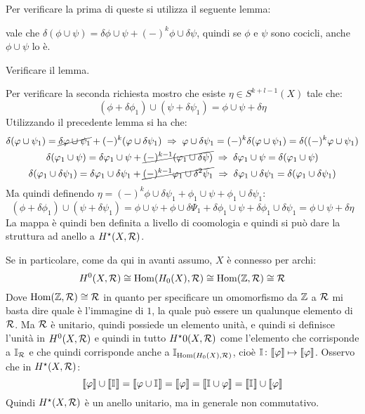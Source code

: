 Per verificare la prima di queste si utilizza il seguente lemma:
\begin{lemma}
  vale che $ \delta(\phi \cup \psi) = \delta \phi \cup \psi + (-)^k \phi \cup \delta \psi $, quindi se $ \phi $ e $ \psi $ sono cocicli,
  anche $ \phi \cup \psi $ lo è.
\end{lemma}
\begin{exercise}
  Verificare il lemma.
\end{exercise}
Per verificare la seconda richiesta mostro che esiste $ \eta \in S^{k+l-1}(X) $ tale che:
\[
  (\phi + \delta\phi_1) \cup (\psi + \delta\psi_1) = \phi \cup \psi + \delta \eta
\]
Utilizzando il precedente lemma si ha che:
\begin{gather*}
  \delta(\phi \cup \psi_1) = \cancel{\delta \phi \cup \psi_1} + (-)^k (\phi \cup \delta\psi_1) \; \Rightarrow \; \phi \cup \delta \psi_1 = (-)^k \delta(\phi \cup \psi_1) = \delta ((-)^k \phi \cup \psi_1) \\
  \delta(\phi_1 \cup \psi) = \delta \phi_1 \cup \psi + \cancel{(-)^{k-1}(\phi_1 \cup \delta \psi)} \; \Rightarrow \; \delta \phi_1 \cup \psi = \delta(\phi_1 \cup \psi) \\
  \delta(\phi_1 \cup \delta \psi_1) = \delta \phi_1 \cup \delta \psi_1 + \cancel{(-)^{k-1}\phi_1 \cup \delta^2 \psi_1} \; \Rightarrow \; \delta \phi_1 \cup \delta \psi_1  =  \delta(\phi_1 \cup \delta \psi_1)
\end{gather*}
Ma quindi definendo $ \eta = (-)^k \phi \cup \delta \psi_1 + \phi_1 \cup \psi + \phi_1 \cup \delta \psi_1 $:
\[
  (\phi + \delta \phi_1) \cup (\psi + \delta \psi_1) = \phi \cup \psi + \phi \cup \delta \Psi_1 + \delta \phi_1 \cup \psi + \delta \phi_1 \cup \delta \psi_1 = \phi \cup \psi + \delta \eta
\]
La mappa è quindi ben definita a livello di coomologia e quindi si può dare la struttura
ad anello a $ H^\star(X,\R) $.

Se in particolare, come da qui in avanti assumo, $ X $ è connesso per archi:
\[
  H^0(X, \R) \cong \hom{H_0(X), \R} \cong \hom{\Z, \R} \cong \R
\]
Dove $ \hom{\Z, \R} \cong \R $ in quanto per specificare un omomorfismo da
$ \Z $ a $ \R $ mi basta dire quale è l'immagine di $ 1 $, la quale può essere
un qualunque elemento di $ \R $. Ma $ \R $ è unitario, quindi possiede un
elemento unità, e quindi si definisce l'unità in $ H^0(X, \R) $ e quindi in
tutto $ H^\star0(X, \R) $ come l'elemento che corrisponde a $ \Id{\R} $ e che quindi
corrisponde anche a $ \Id{\hom{H_0(X), \R}} $, cioè $ \Id{} \colon \llbracket \phi \rrbracket \mapsto \llbracket \phi \rrbracket $.
Osservo che in $ H^\star(X, \R) $:
\[
  \llbracket \phi \rrbracket \cup \llbracket \Id{} \rrbracket = \llbracket \phi \cup \Id{} \rrbracket = \llbracket \phi \rrbracket = \llbracket \Id{} \cup \phi \rrbracket = \llbracket \Id{} \rrbracket \cup \llbracket \phi \rrbracket
\]
Quindi $ H^\star(X, \R) $ è un anello unitario, ma in generale non commutativo.

